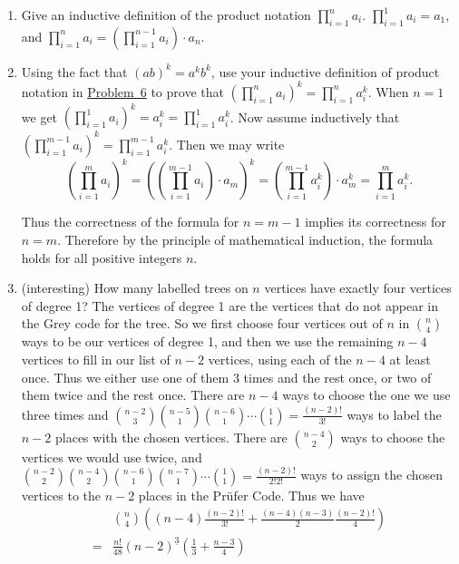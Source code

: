 \documentclass[10pt,]{book}
\theoremstyle{plain}
\theoremstyle{definition}
\numberwithin{equation}{chapter}
\newcommand{\amp}{&}
\begin{document}
\begin{enumerate}
%
\item\hypertarget{inductiveprodnotation}{}Give an inductive definition of the product notation \(\displaystyle
\prod_{i=1}^n a_i\). \(\displaystyle\prod_{i=1}^1a_i=a_1\), and \(\displaystyle\prod_{i=1}^n
a_i= \left(\prod_{i=1}^{n-1}a_i\right)\cdot a_n\).%
%
\item\hypertarget{li-46}{}Using the fact that \((ab)^k =a^kb^k\), use your inductive definition of product notation in \hyperlink{inductiveprodnotation}{Problem~6} to prove that \(\displaystyle \left(\prod_{i=1}^n a_i\right)^k=\prod_{i=1}^n a_i^k\). When \(n=1\) we get \(\displaystyle\left(\prod_{i=1}^1 a_i\right)^k=
a_i^k =\prod_{i=1}^1a_i^k\). Now assume inductively that \(\displaystyle\left(\prod_{i=1}^{m-1}a_i\right)^k=\prod_{i=1}^{m-1}a_i^k\). Then we may write%
\begin{equation*}
\left(\prod_{i=1}^ma_i\right)^k=\left(\left(\prod_{i=1}^{m-1}
a_i\right)\cdot a_m\right)^k=\left(\prod_{i=1}^{m-1}
a_i^k\right)\cdot a_m^k=\prod_{i=1}^m a_i^k.
\end{equation*}
%
\par
Thus the correctness of the formula for \(n=m-1\) implies its correctness for \(n=m\). Therefore by the principle of mathematical induction, the formula holds for all positive integers \(n\).%
%
\item\hypertarget{li-47}{}(interesting) How many labelled trees on \(n\) vertices have exactly four vertices of degree 1? The vertices of degree 1 are the vertices that do not appear in the Grey code for the tree. So we first choose four vertices out of \(n\) in \(\binom{n}{4}\) ways to be our vertices of degree 1, and then we use the remaining \(n-4\) vertices to fill in our list of \(n-2\) vertices, using each of the \(n-4\) at least once. Thus we either use one of them 3 times and the rest once, or two of them twice and the rest once. There are \(n-4\) ways to choose the one we use three times and \(\binom{n-2}{3}\binom{n-5}{1}\binom{n-6}{1}\cdots\binom{1}{1}=\frac{(n-2)!}{3!}\) ways to label the \(n-2\) places with the chosen vertices. There are \(\binom{n-4}{2}\) ways to choose the vertices we would use twice, and \(\binom{n-2}{2}\binom{n-4}{2}\binom{n-6}{1}\binom{n-7}{1}\cdots \binom{1}{1}=\frac{(n-2)!}{2!2!}\) ways to assign the chosen vertices to the \(n-2\) places in the Prüfer Code. Thus we have%
\begin{align*}
\amp \binom{n}{4}\left((n-4)\frac{(n-2)!}{3!} +\frac{(n-4)(n-3)}{2}\frac{(n-2)!}{4}\right)\\
=\amp \frac{n!}{48}(n-2)^{\underline{3}}\left(\frac{1}{3} +\frac{n-3}{4}\right)

\end{align*}
\end{enumerate}
\end{document}
